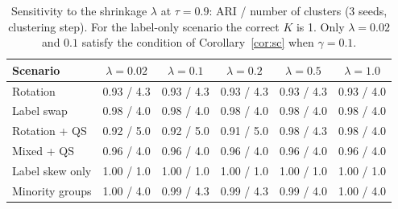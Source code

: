 \begin{table}[h]
\centering
\caption{Sensitivity to the shrinkage $\lambda$ at $\tau=0.9$: ARI / number of clusters (3 seeds, clustering step). For the label-only scenario the correct $K$ is 1. Only $\lambda=0.02$ and $0.1$ satisfy the condition of Corollary~\ref{cor:sc} when $\gamma=0.1$.}\label{tab:lambda}
\small
\begin{tabular}{lccccc}
\toprule
Scenario & $\lambda=0.02$ & $\lambda=0.1$ & $\lambda=0.2$ & $\lambda=0.5$ & $\lambda=1.0$ \\
\midrule
Rotation & 0.93 / 4.3 & 0.93 / 4.3 & 0.93 / 4.3 & 0.93 / 4.3 & 0.93 / 4.0 \\
Label swap & 0.98 / 4.0 & 0.98 / 4.0 & 0.98 / 4.0 & 0.98 / 4.0 & 0.98 / 4.0 \\
Rotation + QS & 0.92 / 5.0 & 0.92 / 5.0 & 0.91 / 5.0 & 0.98 / 4.3 & 0.98 / 4.0 \\
Mixed + QS & 0.96 / 4.0 & 0.96 / 4.0 & 0.96 / 4.0 & 0.96 / 4.0 & 0.96 / 4.0 \\
Label skew only & 1.00 / 1.0 & 1.00 / 1.0 & 1.00 / 1.0 & 1.00 / 1.0 & 1.00 / 1.0 \\
Minority groups & 1.00 / 4.0 & 0.99 / 4.3 & 0.99 / 4.3 & 0.99 / 4.0 & 1.00 / 4.0 \\
\bottomrule
\end{tabular}
\end{table}
